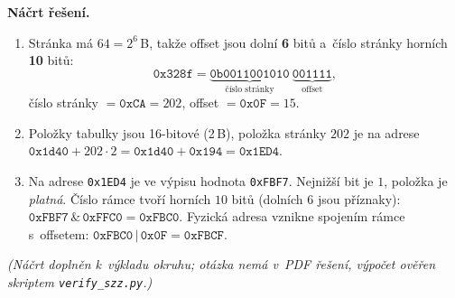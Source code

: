 \medskip
\noindent\textbf{Náčrt řešení.}\par
\begin{enumerate}
\item Stránka má $64=2^{6}$\,B, takže offset jsou dolní \textbf{6} bitů a~číslo stránky horních \textbf{10} bitů:
  \[\texttt{0x328f}=\underbrace{\texttt{0b0011001010}}_{\text{číslo stránky}}\ \underbrace{\texttt{001111}}_{\text{offset}},\]
  číslo stránky $=\boxed{\texttt{0xCA}=202}$, offset $=\boxed{\texttt{0x0F}=15}$.
\item Položky tabulky jsou 16-bitové (2\,B), položka stránky $202$ je na adrese
  $\texttt{0x1d40}+202\cdot 2=\texttt{0x1d40}+\texttt{0x194}=\boxed{\texttt{0x1ED4}}$.
\item Na adrese \texttt{0x1ED4} je ve výpisu hodnota \texttt{0xFBF7}. Nejnižší bit je $1$, položka je
  \emph{platná}. Číslo rámce tvoří horních $10$ bitů (dolních $6$ jsou příznaky): $\texttt{0xFBF7}\,\&\,\texttt{0xFFC0}=\texttt{0xFBC0}$.
  Fyzická adresa vznikne spojením rámce s~offsetem: $\texttt{0xFBC0}\,|\,\texttt{0x0F}=\boxed{\texttt{0xFBCF}}$.
\end{enumerate}
\textit{(Náčrt doplněn k~výkladu okruhu; otázka nemá v~PDF řešení, výpočet ověřen skriptem \texttt{verify\_szz.py}.)}
